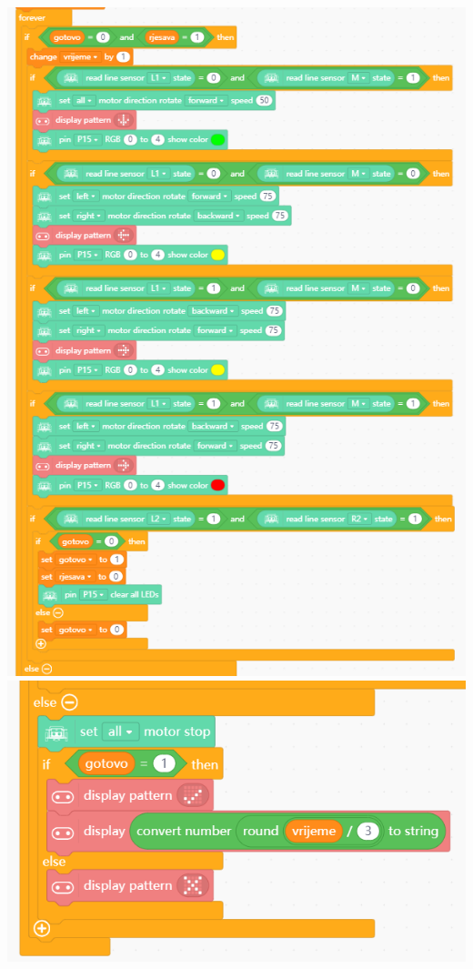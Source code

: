 \includegraphics[scale=0.75,width=\textwidth]{Rjesenje8.png}
\includegraphics[scale=0.75]{Rjesenje9.png}

